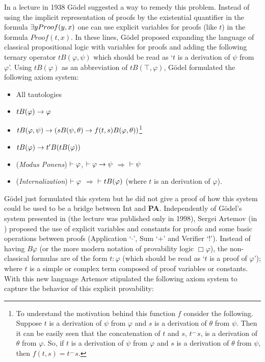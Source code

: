 \qquad In a lecture in 1938 \cite{Goedel38} Gödel suggested a way to remedy this problem. Instead of using the implicit representation of proofs by the existential quantifier in the formula $\exists y Proof (y,x)$ one can use explicit variables for proofs (like $t$) in the formula $Proof (t,x)$. In these lines, Gödel proposed expanding the language of classical propositional logic with variables for proofs and adding the following ternary operator $tB(\varphi,\psi)$ which should be read as `$t$ is a derivation of $\psi$ from $\varphi$'. Using $tB(\varphi)$ as an abbreviation of $tB(\top,\varphi)$, Gödel formulated the following axiom system:

\begin{itemize}
	\item[] All tautologies
	\item[] $tB(\varphi)\rightarrow \varphi$
	\item[] $tB(\varphi,\psi) \rightarrow (sB(\psi,\theta) \rightarrow f(t,s)B(\varphi,\theta))$\footnote{To understand the motivation behind this function $f$ consider the following. Suppose $t$ is a derivation of $\psi$ from $\varphi$ and $s$ is a derivation of $\theta$ from $\psi$. Then it can be easily seen that the concatenation of $t$ and $s$, $t^{\smallfrown}s$, is a derivation of $\theta$ from $\varphi$. So, if $t$ is a derivation of $\psi$ from $\varphi$ and $s$ is a derivation of $\theta$ from $\psi$, then $f(t,s)= t^{\smallfrown}s$.  }
	\item[] $tB(\varphi) \rightarrow t^{\prime} B(tB(\varphi))$
	\item[] (\textit{Modus Ponens}) $\vdash \varphi$, $\vdash \varphi\rightarrow\psi$ $\Rightarrow$ $\vdash \psi$
	\item[] (\textit{Internalization})  $\vdash \varphi$ $\Rightarrow$ $\vdash tB(\varphi)$ (where $t$ is an derivation of $\varphi$).
\end{itemize}


\qquad Gödel just formulated this system but he did not give a proof of how this system could be used to be a bridge between Int and \textbf{PA}. Independently of Gödel's system presented in \cite{Goedel38} (the lecture was published only in 1998), Sergei Artemov (in \cite{Artemov01}) proposed the use of explicit variables and constants for proofs and some basic operations between proofs (Application `$\cdot$', Sum `$+$' and Verifier `$!$'). Instead of having $B\varphi$ (or the more modern notation of provability logic $\Box \varphi$), the non-classical formulas are of the form $t$$:$$\varphi$ (which should be read as `$t$ is a proof of $\varphi$'); where $t$ is a simple or complex term composed of proof variables or constants. With this new language Artemov stipulated the following axiom system to capture the behavior of this explicit provability:     

